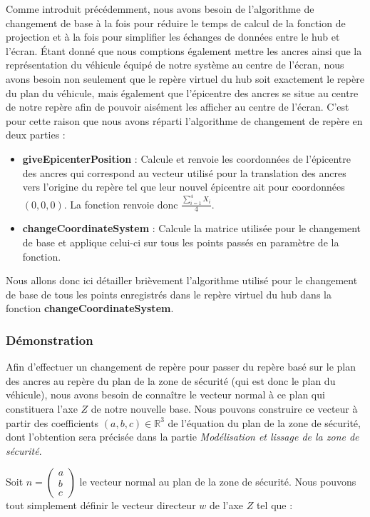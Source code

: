 Comme introduit précédemment, nous avons besoin de l'algorithme de changement de base à la fois pour réduire le temps de calcul de la fonction de projection et à la fois pour simplifier les échanges de données entre le hub et l'écran. Étant donné que nous comptions également mettre les ancres ainsi que la représentation du véhicule équipé de notre système au centre de l'écran, nous avons besoin non seulement que le repère virtuel du hub soit exactement le repère du plan du véhicule, mais également que l'épicentre des ancres se situe au centre de notre repère afin de pouvoir aisément les afficher au centre de l'écran. C'est pour cette raison que nous avons réparti l'algorithme de changement de repère en deux parties :

\begin{itemize}
   \item {\ttfamily \textbf{giveEpicenterPosition}} : Calcule et renvoie les coordonnées de l'épicentre des ancres qui correspond au vecteur utilisé pour la translation des ancres vers l'origine du repère tel que leur nouvel épicentre ait pour coordonnées $(0, 0, 0)$. La fonction renvoie donc $\frac{\sum_{i=1}^{4}X_i}{4}$.
   \item {\ttfamily \textbf{changeCoordinateSystem}} : Calcule la matrice utilisée pour le changement de base et applique celui-ci sur tous les points passés en paramètre de la fonction.
\end{itemize}

Nous allons donc ici détailler brièvement l'algorithme utilisé pour le changement de base de tous les points enregistrés dans le repère virtuel du hub dans la fonction {\ttfamily \textbf{changeCoordinateSystem}}.

\subsubsection{Démonstration}

Afin d'effectuer un changement de repère pour passer du repère basé sur le plan des ancres au repère du plan de la zone de sécurité (qui est donc le plan du véhicule), nous avons besoin de connaître le vecteur normal à ce plan qui constituera l'axe $Z$ de notre nouvelle base. Nous pouvons construire ce vecteur à partir des coefficients $(a, b, c)\in \mathbb{R}^3$ de l'équation du plan de la zone de sécurité, dont l'obtention sera précisée dans la partie \emph{Modélisation et lissage de la zone de sécurité}.

Soit $n=$$\begin{pmatrix}
    a \\
    b \\
    c
\end{pmatrix}$ le vecteur normal au plan de la zone de sécurité. Nous pouvons tout simplement définir le vecteur directeur $w$ de l'axe $Z$ tel que :


